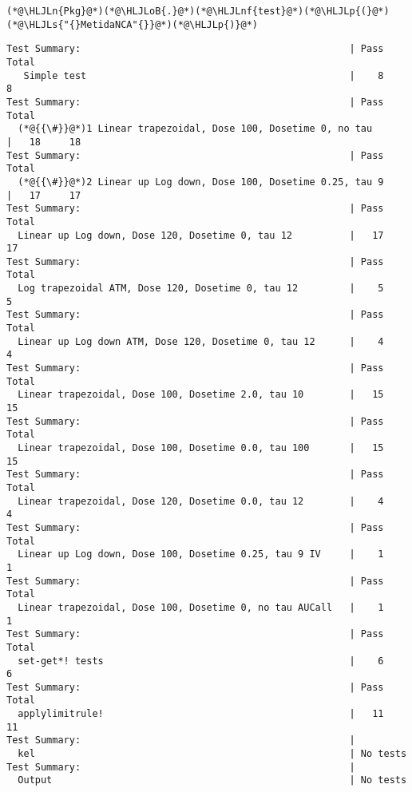 \documentclass[12pt,a4paper]{article}
\newcommand{\HLJLn}[1]{#1}
\newcommand{\HLJLnf}[1]{\textcolor[RGB]{66,102,213}{#1}}
\newcommand{\HLJLs}[1]{\textcolor[RGB]{201,61,57}{#1}}
\newcommand{\HLJLoB}[1]{\textcolor[RGB]{102,102,102}{\textbf{#1}}}
\newcommand{\HLJLp}[1]{#1}
\begin{document}
\begin{lstlisting}
(*@\HLJLn{Pkg}@*)(*@\HLJLoB{.}@*)(*@\HLJLnf{test}@*)(*@\HLJLp{(}@*)(*@\HLJLs{"{}MetidaNCA"{}}@*)(*@\HLJLp{)}@*)
\end{lstlisting}

\begin{lstlisting}
Test Summary:                                               | Pass  Total
   Simple test                                              |    8      8
Test Summary:                                               | Pass  Total
  (*@{{\#}}@*)1 Linear trapezoidal, Dose 100, Dosetime 0, no tau       |   18     18
Test Summary:                                               | Pass  Total
  (*@{{\#}}@*)2 Linear up Log down, Dose 100, Dosetime 0.25, tau 9     |   17     17
Test Summary:                                               | Pass  Total
  Linear up Log down, Dose 120, Dosetime 0, tau 12          |   17     17
Test Summary:                                               | Pass  Total
  Log trapezoidal ATM, Dose 120, Dosetime 0, tau 12         |    5      5
Test Summary:                                               | Pass  Total
  Linear up Log down ATM, Dose 120, Dosetime 0, tau 12      |    4      4
Test Summary:                                               | Pass  Total
  Linear trapezoidal, Dose 100, Dosetime 2.0, tau 10        |   15     15
Test Summary:                                               | Pass  Total
  Linear trapezoidal, Dose 100, Dosetime 0.0, tau 100       |   15     15
Test Summary:                                               | Pass  Total
  Linear trapezoidal, Dose 120, Dosetime 0.0, tau 12        |    4      4
Test Summary:                                               | Pass  Total
  Linear up Log down, Dose 100, Dosetime 0.25, tau 9 IV     |    1      1
Test Summary:                                               | Pass  Total
  Linear trapezoidal, Dose 100, Dosetime 0, no tau AUCall   |    1      1
Test Summary:                                               | Pass  Total
  set-get*! tests                                           |    6      6
Test Summary:                                               | Pass  Total
  applylimitrule!                                           |   11     11
Test Summary:                                               |
  kel                                                       | No tests
Test Summary:                                               |
  Output                                                    | No tests
\end{lstlisting}
\end{document}
